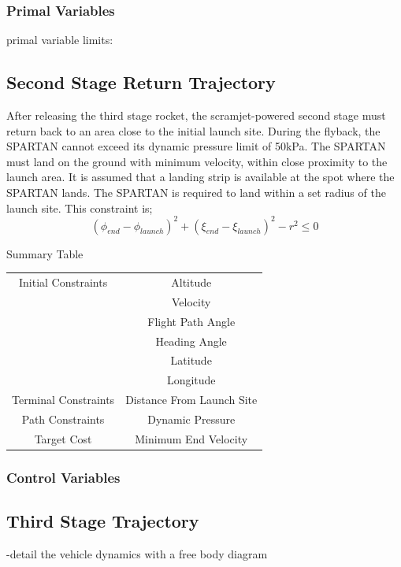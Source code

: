 \subsubsection{Primal Variables}
primal variable limits:

\subsection{Second Stage Return Trajectory}
After releasing the third stage rocket, the scramjet-powered second stage must return back to an area close to the initial launch site.
During the flyback, the SPARTAN cannot exceed its dynamic pressure limit of 50kPa. 
The SPARTAN must land on the ground with minimum velocity, within close proximity to the launch area. It is assumed that a landing strip is available at the spot where the SPARTAN lands. The SPARTAN is required to land within a set radius of the launch site. This constraint is;
\begin{equation}
(\phi_{end} - \phi_{launch})^2 + (\xi_{end} - \xi_{launch})^2 - r^2 \leq 0
\end{equation}



Summary Table

\begin{tabular}{|c|c|}
	\hline Initial Constraints  & Altitude \\ & Velocity\\ & Flight Path Angle\\ & Heading Angle\\ & Latitude\\ & Longitude\\ 
	\hline Terminal Constraints &  Distance From Launch Site \\ 
	\hline Path Constraints & Dynamic Pressure \\ 
	\hline Target Cost & Minimum End Velocity \\ 
	\hline 
\end{tabular} 

\subsubsection{Control Variables}


\subsection{Third Stage Trajectory}

-detail the vehicle dynamics with a free body diagram 

